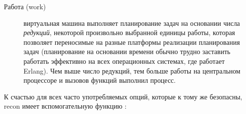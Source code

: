 \documentclass[11pt, oneside]{book}   	%
\begin{document}
\begin{description*}
\item[Работа (work)] \hfill
	\begin{description}
	\item[] виртуальная машина выполняет планирование задач на основании числа \emph{редукций}, некоторой произвольно выбранной единицы работы, которая позволяет переносимые на разные платформы реализации планирования задач (планирование на основании времени обычно трудно заставить работать эффективно на всех операционных системах, где работает Erlang). Чем выше число редукций, тем больше работы на центральном процессоре и вызовов функций выполнил процесс.
	\end{description}
\end{description*}

К счастью для всех часто употребляемых опций, которые к тому же безопасны, recon имеет вспомогательную функцию :

\end{document}
